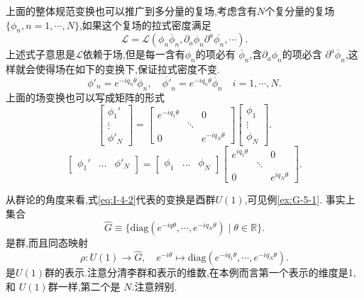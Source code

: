 \documentclass[../main.tex]{subfiles}
\begin{document}
 上面的整体规范变换也可以推广到多分量的复场,考虑含有$N$个复分量的复场$\{\phi_n, n = 1, \cdots ,N\}$,如果这个复场的拉式密度满足\[
 \mathscr{L} = \mathscr{L}(\phi_n \overline{\phi}_n, \partial_a \phi_n \partial^a \overline{\phi_n},\cdots)
 .\] 
 上述式子意思是$\mathscr{L}$依赖于场,但是每一含有$\phi_n$的项必有 $\overline{\phi}_n$,含$\partial_a \phi_n$的项必含 $\partial^a \overline{\phi}_n$,这样就会使得场在如下的变换下,保证拉式密度不变.\[
 \phi'_n = e^{-iq_n \theta} \phi_n, \quad \overline{\phi'}_n = e^{-iq_n \theta} \overline{\phi}_n \quad i = 1, \cdots ,N
 .\] 
 上面的场变换也可以写成矩阵的形式\[
 \begin{bmatrix}  \phi_1'\\ \vdots \\ \phi'_N\end{bmatrix} = 
 \begin{bmatrix} e^{-iq_1\theta}&&0\\&\ddots& \\ 0 && e^{-iq_N \theta}  \end{bmatrix} 
 \begin{bmatrix} \phi_1 \\ \vdots \\ \phi_N \end{bmatrix} 
 .\] 
 \[
 \begin{bmatrix}  \phi_1'& \ldots & \phi'_N\end{bmatrix} = 
 \begin{bmatrix} \phi_1 & \ldots & \phi_N \end{bmatrix} 
 \begin{bmatrix} e^{iq_1\theta}&&0\\&\ddots& \\ 0 && e^{iq_N \theta}  \end{bmatrix} 
 .\] 

 从群论的角度来看,式\ref{eq:I-4-2}代表的变换是酉群$U(1)$,可见例\ref{ex:G-5-1}.
 事实上集合\[
 \hat{G} \equiv \{\text{diag} (e ^{-iq \theta}, \cdots , e^{-i q_N \theta}) \mid \theta \in \mathbb{R} \}
 .\] 
 是群,而且同态映射\[
 \rho : U(1) \to \hat{G}, \quad  e^{-i\theta} \mapsto \text{diag}(e^{-iq_1\theta},\cdots , e^{-iq_N \theta})
 .\] 
 是$U(1)$群的表示.注意分清李群和表示的维数,在本例而言第一个表示的维度是1,和 $U(1)$群一样,第二个是 $N$.注意辨别.
\end{document}
